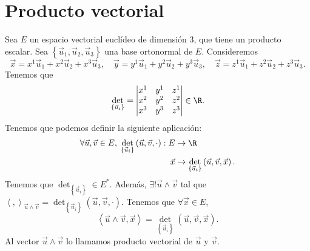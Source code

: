 \section{Producto vectorial}
Sea $\displaystyle E $ un espacio vectorial euclídeo de dimensión 3, que tiene un producto escalar. Sea $\displaystyle \left\{ \vec{u}_{1}, \vec{u}_{2}, \vec{u}_{3}\right\}  $ una base ortonormal de $\displaystyle E $. Consideremos 
\[\vec{x} = x^{1}\vec{u}_{1} +x^{2}\vec{u}_{2} +x^{3}\vec{u}_{3}, \quad \vec{y}= y^{1}\vec{u}_{1} + y^{2}\vec{u}_{2} + y^{3}\vec{u}_{3}, \quad \vec{z} = z^{1}\vec{u}_{1} + z^{2}\vec{u}_{2} + z^{3}\vec{u}_{3} .\]
Tenemos que 
\[\det_{ \left\{ \vec{u}_{i}\right\} } = \begin{vmatrix} x^{1} & y^{1} & z^{1} \\
x^{2} & y^{2} & z^{2} \\
x^{3} & y^{3} & z^{3}\end{vmatrix} \in \R .\]
Tenemos que podemos definir la siguiente aplicación: 
\[
\begin{split}
	\forall \vec{u}, \vec{v} \in E, \; \det_{ \left\{ \vec{u}_{i}\right\} } \left(\vec{u}, \vec{v}, \cdot \right) : E & \to \R \\
	\vec{x} & \to \det_{ \left\{ \vec{u}_{i}\right\} }\left(\vec{u}, \vec{v}, \vec{x}\right).
\end{split}
\]
Tenemos que $\displaystyle \det_{ \left\{ \vec{u}_{i}\right\} } \in E^{*} $. Además, $\displaystyle \exists!\vec{u} \land \vec{v} $ tal que $\displaystyle \left\langle ,  \right\rangle _{\vec{u}\land\vec{v}} = \det_{ \left\{ \vec{u}_{i}\right\} }\left(\vec{u}, \vec{v}, \cdot\right) $. Tenemos que $\displaystyle \forall \vec{x} \in E $, 
\[\left\langle \vec{u}\land\vec{v}, \vec{x} \right\rangle = \det_{ \left\{ \vec{u}_{i}\right\} }\left(\vec{u}, \vec{v}, \vec{x}\right) .\]
Al vector $\displaystyle \vec{u} \land \vec{v} $ lo llamamos producto vectorial de $\displaystyle \vec{u} $ y $\displaystyle \vec{v} $.
